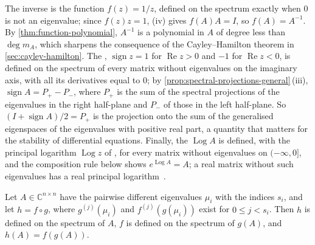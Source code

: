 The inverse is the function $f(z)=1/z$, defined on the spectrum exactly when $0$ is not an eigenvalue; since $f(z)z=1$, (iv) gives $f(A)A=I$, so $f(A)=A^{-1}$. By \cref{thm:function-polynomial}, $A^{-1}$ is a polynomial in $A$ of degree less than $\deg m_A$, which sharpens the consequence of the Cayley--Hamilton theorem in \cref{sec:cayley-hamilton}. The , $\operatorname{sign}z=1$ for $\operatorname{Re}z>0$ and $-1$ for $\operatorname{Re}z<0$, is defined on the spectrum of every matrix without eigenvalues on the imaginary axis, with all its derivatives equal to $0$; by \cref{prop:spectral-projections-general}\,(iii), $\operatorname{sign}A=P_+-P_-$, where $P_+$ is the sum of the spectral projections of the eigenvalues in the right half-plane and $P_-$ of those in the left half-plane. So $(I+\operatorname{sign}A)/2=P_+$ is the projection onto the sum of the generalised eigenspaces of the eigenvalues with positive real part, a quantity that matters for the stability of differential equations. Finally, the  $\operatorname{Log}A$ is defined, with the principal logarithm $\operatorname{Log}z$ of , for every matrix without eigenvalues on $(-\infty,0]$, and the composition rule below shows $e^{\operatorname{Log}A}=A$; a real matrix without such eigenvalues has a real principal logarithm~\cite[Chap.~11]{higham2008}.

\begin{theorem}[Composition]
\label{thm:function-composition}
Let $A\in\mathbb C^{n\times n}$ have the pairwise different eigenvalues $\mu_i$ with the indices $s_i$, and let $h=f\circ g$, where $g^{(j)}(\mu_i)$ and $f^{(j)}(g(\mu_i))$ exist for $0\le j<s_i$. Then $h$ is defined on the spectrum of $A$, $f$ is defined on the spectrum of $g(A)$, and $h(A)=f(g(A))$.
\end{theorem}

